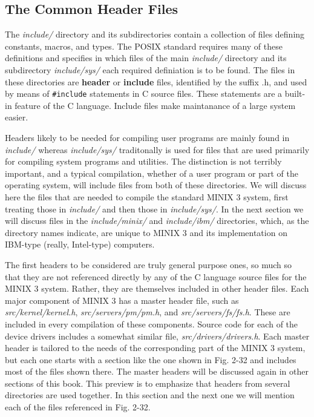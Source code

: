 \documentclass{book}
\newcommand {\kw}  [1] {\textbf{#1}}
\newcommand {\sys} [1] {\textsl{#1}}
\newcommand {\cmd} [1] {\texttt{#1}}
\begin{document}
\subsection{The Common Header Files}
The \sys{include/} directory and its subdirectories contain a collection of files defining constants, macros, and types.
The POSIX standard requires many of these definitions and specifies in which files of the main \sys{include/} directory 
and its subdirectory \sys{include/sys/} each required definiation is to be found.
The files in these directories are \kw{header} or \kw{include} files,
identified by the suffix .h, and used by means of \cmd{\#include} statements in C source files.
These statements are a built-in feature of the C language.
Include files make maintanance of a large system easier.

Headers likely to be needed for compiling user programs are mainly found in \sys{include/} 
whereas \sys{include/sys/} traditonally is used for files that are used primarily for compiling system programs and utilities.
The distinction is not terribly important, and a typical compilation, whether of a user program or part of the operating system, 
will include files from both of these directories.
We will discuss here the files that are needed to compile the standard MINIX 3 system, 
first treating those in \sys{include/} and then those in \sys{include/sys/}.
In the next section we will discuss files in the \sys{include/minix/} and \sys{include/ibm/} directories, 
which, as the directory names indicate, are unique to MINIX 3 and its implementation on IBM-type (really, Intel-type) computers.

The first headers to be considered are truly general purpose ones, 
so much so that they are not referenced directly by any of the C language source files for the MINIX 3 system.
Rather, they are themselves included in other header files.
Each major component of MINIX 3 has a master header file, 
such as \sys{src/kernel/kernel.h}, \sys{src/servers/pm/pm.h}, and \sys{src/servers/fs/fs.h}.
These are included in every compilation of these components.
Source code for each of the device drivers includes a somewhat similar file, \sys{src/drivers/drivers.h}.
Each master header is tailored to the needs of the corresponding part of the MINIX 3 system,
but each one starts with a section like the one shown in Fig. 2-32 and includes most of the files shown there.
The master headers will be discussed again in other sections of this book.
This preview is to emphasize that headers from several directories are used together.
In this section and the next one we will mention each of the files referenced in Fig. 2-32.
\end{document}
